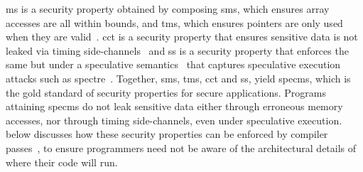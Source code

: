 \documentclass[dvipsnames,conference]{IEEEtran}
\theoremstyle{definition}
\begin{document}

\gls*{ms} is a security property obtained by composing \gls*{sms}, which ensures array accesses are all within bounds, and \gls*{tms}, which ensures pointers are only used when they are valid~\cite{azevedo2018meaningsofms,jim2002cyclone,necula2005ccured,nagarakatte2010cets,nagarakatte2009soft,akritidis2009baggy,michael2023mswasm}.
\gls*{cct} is a security property that ensures sensitive data is not leaked via timing side-channels~\cite{kocher1996timing} and \gls*{ss} is a security property that enforces the same but under a speculative semantics~\cite{guarnieri2018spectector,fabian2022automatic} that captures speculative execution attacks such as spectre~\cite{kocher2019spectre}.
Together, \gls*{sms}, \gls*{tms}, \gls*{cct} and \gls*{ss}, yield \gls*{specms}, which is the gold standard of security properties for secure applications.
Programs attaining \gls*{specms} do not leak sensitive data either through erroneous memory accesses, nor through timing side-channels, even under speculative execution.
 below discusses how these security properties can be enforced by compiler passes~\cite{bond2017vale,almeida2017jasmin}, to ensure programmers need not be aware of the architectural details of where their code will run.
\end{document}
